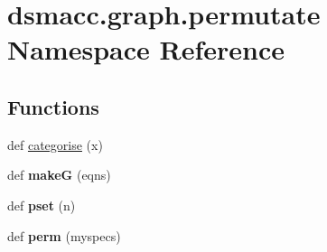 \hypertarget{namespacedsmacc_1_1graph_1_1permutate}{}\section{dsmacc.\+graph.\+permutate Namespace Reference}
\label{namespacedsmacc_1_1graph_1_1permutate}
\subsection*{Functions}
\begin{DoxyCompactItemize}
\item 
def \mbox{\hyperlink{namespacedsmacc_1_1graph_1_1permutate_ac0614585c1ae3a0bfd5ffe1608eed055}{categorise}} (x)
\item 
\mbox{\label{namespacedsmacc_1_1graph_1_1permutate_adbb5847ef25ddab14ad6fb95393c9ae2}} 
def {\bfseries makeG} (eqns)
\item 
\mbox{\label{namespacedsmacc_1_1graph_1_1permutate_affc4b36078533d83f3e03a2c3d139a39}} 
def {\bfseries pset} (n)
\item 
\mbox{\label{namespacedsmacc_1_1graph_1_1permutate_aab83cf2eeabe52b40077529c283630d1}} 
def {\bfseries perm} (myspecs)
\end{DoxyCompactItemize}
